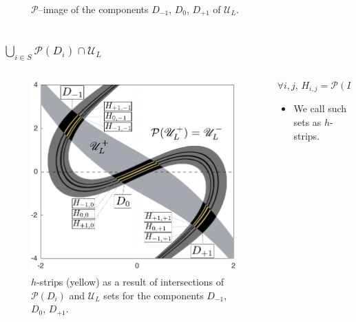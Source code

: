 \documentclass [10pt] {beamer}
\begin{document}
\begin{frame}
\begin{columns}[T]
\begin{column}{.5\textwidth}
\begin{figure}
			\caption{$\mathcal{P}$--image of the components $D_{-1}$, $D_0$, $D_{+1}$ of $\mathscr{U}_L$.}
			\label{pic:h-strips-step-5}
			\end{figure}
		\end{column}
	\end{columns}
\end{frame}

\begin{frame}
	\frametitle{$\bigcup_{i \in S} \mathcal{P}(D_i) \cap \mathscr{U}_L$}
	\begin{columns}[T]
		\begin{column}{.5\textwidth}
			\begin{figure}
			\includegraphics[width = 1\textwidth]{pic/h-strips-step-6.pdf}
			\caption{$h$-strips (yellow) as a result of intersections of $\mathcal{P}(D_i)$ and $\mathscr{U}_L$ sets for the components $D_{-1}$, $D_0$, $D_{+1}$.}
			\label{pic:h-strips-step-6}
			\end{figure}
		\end{column}
		\begin{column}{.5\textwidth}
			\begin{equation*}
				\forall i, j, \, H_{i, j} = \mathcal{P}(D_i) \cap D_j \neq \varnothing.
			\end{equation*}
			\begin{itemize}
				\item We call such sets as $h$-strips.\\[10pt]

\end{itemize}
\end{column}
\end{columns}
\end{frame}
\end{document}
